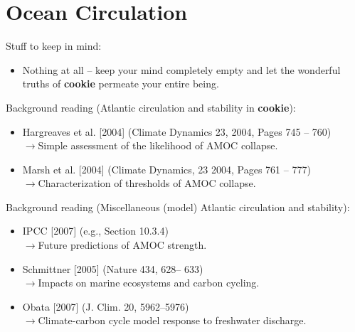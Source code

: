 
\cleardoublepage


\chapter{Ocean Circulation}\label{ch:ocean-circulation}

\hfill \break

\noindent Stuff to keep in mind:

\begin{itemize}
\item Nothing at all – keep your mind completely empty and let the wonderful truths of \textbf{cookie} permeate your entire being.
\end{itemize}

\vspace{2mm}
\noindent Background reading (Atlantic circulation and stability in \textbf{cookie}):

\vspace{2mm}
\begin{itemize}
\item Hargreaves et al. [2004] (Climate Dynamics 23, 2004, Pages 745 – 760)
\\\(\rightarrow\)Simple assessment of the likelihood of AMOC collapse.
\item Marsh et al. [2004] (Climate Dynamics, 23 2004, Pages 761 – 777)
\\\(\rightarrow\)Characterization of thresholds of AMOC collapse.
\end{itemize}

\vspace{2mm}
\noindent Background reading (Miscellaneous (model) Atlantic circulation and stability):

\vspace{2mm}
\begin{itemize}
\item IPCC [2007] (e.g., Section 10.3.4)
\\\(\rightarrow\)Future predictions of AMOC strength.
\item Schmittner [2005] (Nature 434, 628– 633)
\\\(\rightarrow\)Impacts on marine ecosystems and carbon cycling.
\item Obata [2007] (J. Clim. 20, 5962–5976)
\\\(\rightarrow\)Climate-carbon cycle model response to freshwater discharge.
\end{itemize}

